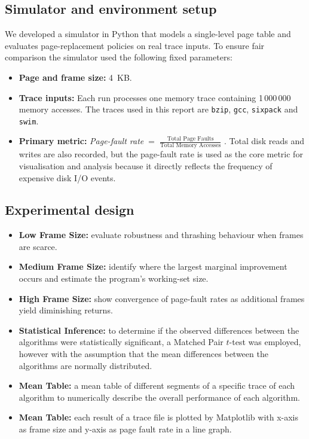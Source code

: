 \documentclass[a4paper, 11pt]{report}
\begin{document}
\subsection*{Simulator and environment setup}
\label{ssec:simulator}
We developed a simulator in Python that models a single-level page table and evaluates page-replacement policies on real trace inputs. To ensure fair comparison the simulator used the following fixed parameters:
\begin{itemize}
  \item \textbf{Page and frame size:} 4~KB.
  \item \textbf{Trace inputs:} Each run processes one memory trace containing 1\,000\,000 memory accesses. The traces used in this report are \texttt{bzip}, \texttt{gcc}, \texttt{sixpack} and \texttt{swim}.
  \item \textbf{Primary metric:} \emph{Page-fault rate}$\;=\; \frac{\text{Total Page Faults}}{\text{Total Memory Accesses}}$
  . Total disk reads and writes are also recorded, but the page-fault rate is used as the core metric for visualisation and analysis because it directly reflects the frequency of expensive disk I/O events.
\end{itemize}

\subsection*{Experimental design}
\begin{itemize}
    \item \textbf{Low Frame Size:} evaluate robustness and thrashing behaviour when frames are scarce.
    \item \textbf{Medium Frame Size:} identify where the largest marginal improvement occurs and estimate the program's working-set size.
    \item \textbf{High Frame Size:} show convergence of page-fault rates as additional frames yield diminishing returns.
    \item \textbf{Statistical Inference:} to determine if the observed differences between the algorithms were statistically significant, a Matched Pair $t$-test was employed, however with the assumption that the mean differences between the algorithms are normally distributed.
    \item \textbf{Mean Table:} a mean table of different segments of a specific trace of each algorithm to numerically describe the overall performance of each algorithm.
    \item \textbf{Mean Table:} each result of a trace file is plotted by Matplotlib with x-axis as frame size and y-axis as page fault rate in a line graph.
\end{itemize}
\newpage
\end{document}
